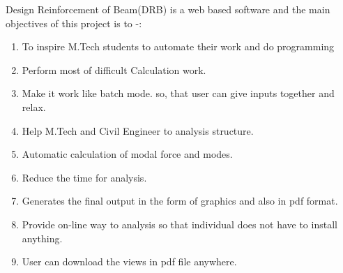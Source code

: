 Design Reinforcement of Beam(DRB) is a web based software and the 
main objectives of this project is to -:
\begin{enumerate}
\item To inspire M.Tech students to automate their work and do programming 
\item Perform most of difficult Calculation work.
\item Make it work like batch mode. so, that user can give inputs 
together and relax.
\item Help M.Tech and Civil Engineer to analysis structure.
\item Automatic calculation of modal force and modes.
\item Reduce the time for analysis.
\item Generates the final output in the form of graphics and also in pdf format.
\item Provide on-line way to analysis so that individual does not have to 
install anything.
\item User can download the views in pdf file anywhere.
\end{enumerate}
